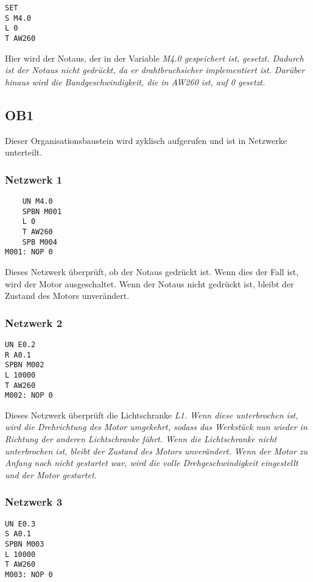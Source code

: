 \documentclass{report}
\begin{document}
\begin{lstlisting}
SET
S M4.0 
L 0
T AW260
\end{lstlisting}
Hier wird der Notaus, der in der Variable \it{M4.0} gespeichert ist, gesetzt. Dadurch ist der Notaus nicht gedrückt, da er drahtbruchsicher implementiert ist. Darüber hinaus wird die Bandgeschwindigkeit, die in AW260 ist, auf 0 gesetzt.

\subsection{OB1}
Dieser Organisationsbaustein wird zyklisch aufgerufen und ist in Netzwerke unterteilt.

\subsubsection{Netzwerk 1}

\begin{lstlisting}
    UN M4.0 
    SPBN M001 
    L 0
    T AW260
    SPB M004 
M001: NOP 0
\end{lstlisting}
Dieses Netzwerk überprüft, ob der Notaus gedrückt ist. Wenn dies der Fall ist, wird der Motor ausgeschaltet. Wenn der Notaus nicht gedrückt ist, bleibt der Zustand des Motors unverändert.

\subsubsection{Netzwerk 2}

\begin{lstlisting}
UN E0.2 
R A0.1
SPBN M002 
L 10000 
T AW260
M002: NOP 0
\end{lstlisting}
Dieses Netzwerk überprüft die Lichtschranke \it{L1}. Wenn diese unterbrochen ist, wird die Drehrichtung des Motor umgekehrt, sodass das Werkstück nun wieder in Richtung der anderen Lichtschranke fährt. Wenn die Lichtschranke nicht unterbrochen ist, bleibt der Zustand des Motors unverändert. Wenn der Motor zu Anfang noch nicht gestartet war, wird die volle Drehgeschwindigkeit eingestellt und der Motor gestartet.

\subsubsection{Netzwerk 3}

\begin{lstlisting}
UN E0.3
S A0.1
SPBN M003
L 10000
T AW260
M003: NOP 0
\end{lstlisting}
\end{document}
